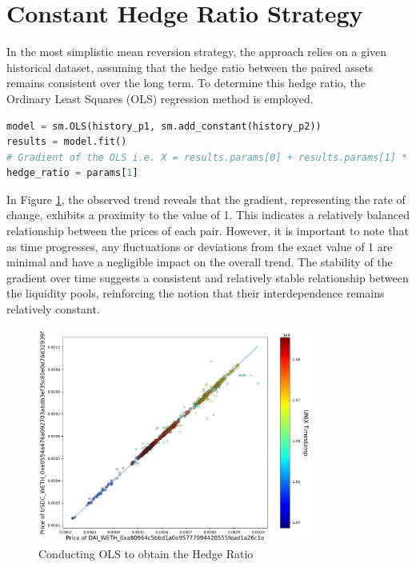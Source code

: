 \section{Constant Hedge Ratio Strategy}
In the most simplistic mean reversion strategy, the approach relies on a given historical dataset, assuming that the hedge ratio between the paired assets remains consistent over the long term. To determine this hedge ratio, the Ordinary Least Squares (OLS) regression method is employed.
\begin{lstlisting}[language=Python]
model = sm.OLS(history_p1, sm.add_constant(history_p2))
results = model.fit()
# Gradient of the OLS i.e. X = results.params[0] + results.params[1] * 'p2_token1_price'
hedge_ratio = params[1]
\end{lstlisting}
\vspace{5mm}
In Figure \ref{fig:f1}, the observed trend reveals that the gradient, representing the rate of change, exhibits a proximity to the value of 1. This indicates a relatively balanced relationship between the prices of each pair. However, it is important to note that as time progresses, any fluctuations or deviations from the exact value of 1 are minimal and have a negligible impact on the overall trend. The stability of the gradient over time suggests a consistent and relatively stable relationship between the liquidity pools, reinforcing the notion that their interdependence remains relatively constant.
\begin{figure}[!htb]
    \centering
    \includegraphics[width=0.8\textwidth]{project/Images/simple_hedge_ratio.png}
    \caption{Conducting OLS to obtain the Hedge Ratio \label{fig:f1}}
\end{figure}

